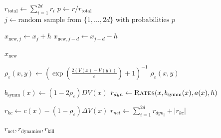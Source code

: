 \documentclass[english,11pt]{article}%
\numberwithin{equation}{section}
\numberwithin{example}{section}
\numberwithin{theorem}{section}
\begin{document}
\begin{algorithm}
\caption{One Step Transition of SDE Jump Process}
\begin{algorithmic}[1]

\State $r_{\text{total}} \gets \sum_{i=1}^{2d} r_i$
\State $p \gets r / r_{\text{total}}$ 
\State $j \gets \text{random sample from } \{1, \dots, 2d\} \text{ with probabilities } p$

    \State $x_{\text{new}, j} \gets x_j + h$
\Else
    \State $x_{\text{new}, j - d} \gets x_{j-d} - h$
\EndIf

\State \Return $x_{\text{new}}$
\EndFunction
\end{algorithmic}
\label{alg:sdetransition}
\end{algorithm}

\begin{algorithm}
\caption{Stable computation of infinite swap rate}
\begin{algorithmic}[1]
\State $\rho_\varepsilon(x,y) \gets \left(\exp\left(\frac{2(V(x) - V(y))}{\varepsilon}\right) + 1\right)^{-1}$
\State \Return $\rho_\varepsilon(x,y)$
\EndFunction
\end{algorithmic}
\label{alg:infswapcomputation}
\end{algorithm}


\begin{algorithm}
\caption{Compute Event Rates for Particle $x$}
\begin{algorithmic}[1]

\State $b_{\text{symm}}(x) \gets (1 - 2 \rho_\varepsilon)DV(x)$
\State $r_{dyn} \gets  \textsc{Rates}(x, b_{\text{symm}}(x), a(x), h)$ 

\State $r_{kc} \gets c(x) - (1- \rho_\varepsilon)\Delta V(x)$ 
\State $r_{{net}} \gets \sum_{i = 1}^{2d} r_{{dyn}_i} + |r_{kc}|$ 

\State \Return $r_{\text{net}}, r_{\text{dynamics}}, r_{\text{kill}}$
\EndFunction
\end{algorithmic}
\label{alg:eventrates}
\end{algorithm}
\end{document}
